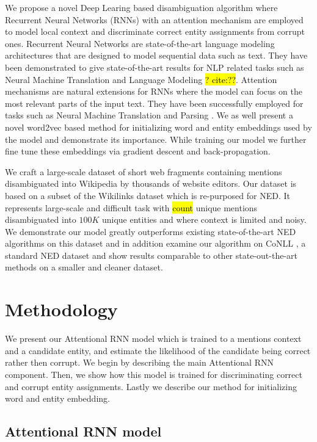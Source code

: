 \documentclass[11pt]{article}
\begin{document}
	We propose a novel Deep Learing based disambiguation algorithm where Recurrent Neural Networks (RNNs) with an attention mechanism are employed to model local context and discriminate correct entity assignments from corrupt ones. Recurrent Neural Networks are state-of-the-art language modeling architectures that are designed to model sequential data such as text. They have been demonstrated to give state-of-the-art results for NLP related tasks such as Neural Machine Translation \cite{bahdanau2014neural} and Language Modeling \hl{? cite:??}. Attention mechanisms are natural extensions for RNNs where the model can focus on the most relevant parts of the input text. They have been successfully employed for tasks such as Neural Machine Translation \cite{bahdanau2014neural} and Parsing \cite{vinyals2015grammar}. 
	We as well present a novel word2vec based method for initializing word and entity embeddings used by the model and demonstrate its importance. While training our model we further fine tune these embeddings via gradient descent and back-propagation.
		
	We craft a large-scale dataset of short web fragments containing mentions disambiguated into Wikipedia by thousands of website editors. Our dataset is based on a subset of the Wikilinks dataset \cite{singh12:wiki-links} which is re-purposed for NED. It represents large-scale and difficult task with \hl{count} unique mentions disambiguated into $100K$ unique entities and where context is limited and noisy. We demonstrate our model greatly outperforms existing state-of-the-art NED algorithms on this dataset and in addition examine our algorithm on CoNLL \cite{hoffart2011robust}, a standard NED dataset and show results comparable to other state-out-the-art methods on a smaller and cleaner dataset.
	
	\section{Methodology}
	
	We present our Attentional RNN model which is trained to a mentions context and a candidate entity, and estimate the likelihood of the candidate being correct rather then corrupt. We begin by describing the main Attentional RNN component. Then, we show how this model is trained for discriminating correct and corrupt entity assignments. Lastly we describe our method for initializing word and entity embedding.

	\subsection{Attentional RNN model}
	
\end{document}
